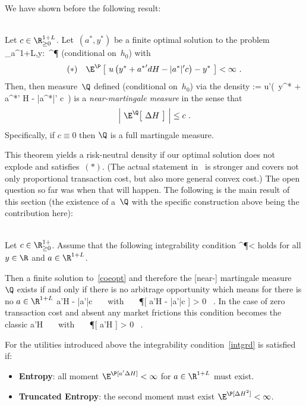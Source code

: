 \documentclass{hbarticle}
\begin{document}
	We have shown before the following result:
	\begin{theorem}\label{th:remove}\hspace{1cm}\\
		Let $c\in\R_{\geq 0}^{1+L}$.
		Let~$(a^*,y^*)$ be a finite optimal solution to the problem
			\sup_{a\in\R^{1+L},y\in\R}:\ \E^\P{} 
		\eqend
        (conditional on~$h_0$)
		with
		$$
			(*) \ \ \ \E^\P\left[\ u\left( y^* + {a^*}' dH -
			|a^*|'c 
			\right)-y^*\ \right] < \infty \ .
		$$
		Then, then measure~$\Q$ 
		defined (conditional on~$h_0$) via the density
		\eqx
			 := u'\big(\ y^* + {a^*}' \Delta H - |a^*|' c\ \big) 
		\eqend
		is a \emph{near-martingale measure} in the sense that
		$$
			\Big|\ \E^\Q\big[\ \Delta H\ \big]\ \Big| \leq c \ .
		$$
		Specifically, if $c\equiv 0$ then $\Q$ is a full martingale
		measure.
	\end{theorem}
	This theorem yields a risk-neutral density if
	our optimal solution does not explode and satisfies~$(*)$. 	 (The actual statement in~\cite{NEARMART} is stronger
		and covers not only proportional transaction cost, but also
		more general convex cost.)
	The 
	open question so far was when that will happen. The
	following is the main result of this section (the existence of a~$\Q$
    with the specific construction above being the contribution here):
	
	\begin{prop}
		\hspace{1cm}\\
		Let $c\in\R_{\geq 0}^{1+}$.
	Assume that the following integrability condition  
		\E^\P{} < \infty 
	\eqend
	holds for all $y\in\R$ and $a\in\R^{1+L}$.

	Then a finite solution to~\eqref {coeopt} and therefore
	the [near-] martingale measure~$\Q$ exists if and only if
	there
	is no arbitrage opportunity which means for
	there is no $a\in\R^{1+L}$
			a'\Delta H - |a'|c  \ \ \ \mbox{with} \ \ \ \P[ a'\Delta H - |a'|c ] > 0 \ .
	\eqend	
	In the case of zero transaction cost and absent any market frictions
	this condition becomes the classic
			a'\Delta H  \ \ \ \mbox{with} \ \ \ \P[ a'\Delta H  ] > 0 \ .
	\eqend
	\end{prop}	
	For the utilities introduced above the integrability
	condition~\eqref {intgrd} is satisfied if:
	\begin{itemize}
		\item \textbf{Entropy}: all moment $\E^\P[ a'\Delta H ]<\infty$
		for $a\in\R^{1+L}$
		must exist.
		
		\item \textbf{Truncated Entropy}: the second moment
		must exist
		$\E^\P[ \Delta H^2 ]<\infty$.
	\end{itemize}
\end{document}
